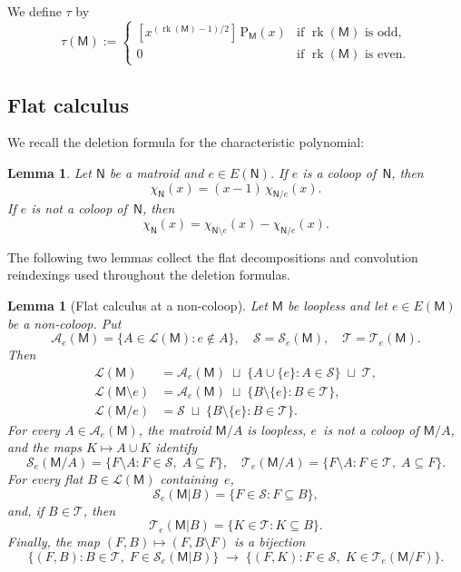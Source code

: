 \documentclass[12pt,letterpaper,english]{amsart}
\theoremstyle{teoremas}
\newtheorem{lemma}[theorem]{Lemma}
\theoremstyle{definition}
\DeclareMathOperator{\rk}{rk}
\newcommand{\M}{\mathsf{M}}
\newcommand{\N}{\mathsf{N}}
\newcommand{\PP}{\mathrm{P}}
\newcommand{\Se}{\mathcal{S}_e}
\newcommand{\Te}{\mathcal{T}_e}
\newcommand{\Ae}{\mathcal{A}_e}
\begin{document}
We define $\tau$ by
\[
\tau(\M) :=
\begin{cases}
[x^{(\rk(\M)-1)/2}]\, \PP_{\M}(x) & \text{if } \rk(\M) \text{ is odd},\\
0 & \text{if } \rk(\M) \text{ is even}.
\end{cases}
\]

\subsection{Flat calculus}
We recall the deletion formula for the characteristic polynomial:
\begin{lemma}\label{lem:char-poly-del}
Let $\N$ be a matroid and $e \in E(\N)$.
If $e$ is a coloop of~$\N$, then
\[
\chi_{\N}(x) = (x-1)\, \chi_{\N/e}(x).
\]
If $e$ is not a coloop of~$\N$, then
\[
\chi_{\N}(x) = \chi_{\N \setminus e}(x) - \chi_{\N/e}(x).
\]
\end{lemma}

The following two lemmas collect the flat decompositions and convolution
reindexings used throughout the deletion formulas.

\begin{lemma}[Flat calculus at a non-coloop]\label{lem:flat-calc}
Let $\M$ be loopless and let $e \in E(\M)$ be a non-coloop.  Put
\[
\Ae(\M) = \{A \in \mathcal{L}(\M) : e \notin A\},\quad
\mathcal{S} = \Se(\M),\quad
\mathcal{T} = \Te(\M).
\]
Then
\begin{align*}
\mathcal{L}(\M)
  &= \Ae(\M) \;\sqcup\; \{A \cup \{e\} : A \in \mathcal{S}\}
     \;\sqcup\; \mathcal{T}, \\
\mathcal{L}(\M \setminus e)
  &= \Ae(\M) \;\sqcup\; \{B \setminus \{e\} : B \in \mathcal{T}\}, \\
\mathcal{L}(\M/e)
  &= \mathcal{S} \;\sqcup\; \{B \setminus \{e\} : B \in \mathcal{T}\}.
\end{align*}
For every $A \in \Ae(\M)$, the matroid $\M/A$ is loopless,
$e$~is not a coloop of $\M/A$, and the maps $K \mapsto A \cup K$ identify
\[
\Se(\M/A) = \{F \setminus A : F \in \mathcal{S},\; A \subseteq F\},\quad
\Te(\M/A) = \{F \setminus A : F \in \mathcal{T},\; A \subseteq F\}.
\]
For every flat $B \in \mathcal{L}(\M)$ containing~$e$,
\[
\Se(\M|B) = \{F \in \mathcal{S} : F \subseteq B\},
\]
and, if $B \in \mathcal{T}$, then
\[
\Te(\M|B) = \{K \in \mathcal{T} : K \subseteq B\}.
\]
Finally, the map $(F,B) \mapsto (F, B \setminus F)$ is a bijection
\[
\{(F,B) : B \in \mathcal{T},\; F \in \Se(\M|B)\}
\;\longrightarrow\;
\{(F,K) : F \in \mathcal{S},\; K \in \Te(\M/F)\}.
\]
\end{lemma}
\end{document}
